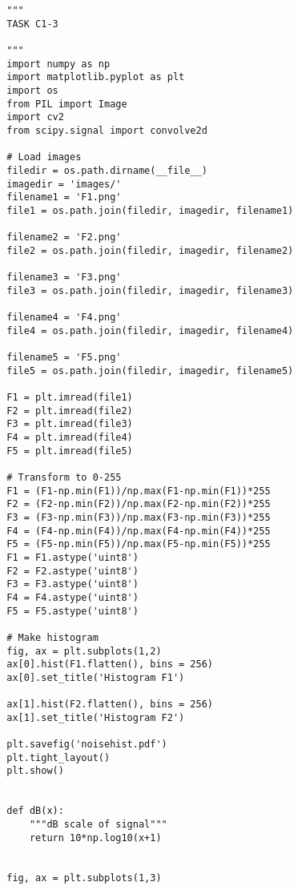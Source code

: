 {\begin{figure}[hbt!]
    \begin{lstlisting}
        """
        TASK C1-3
        
        """
        import numpy as np 
        import matplotlib.pyplot as plt
        import os
        from PIL import Image
        import cv2
        from scipy.signal import convolve2d
        
        # Load images
        filedir = os.path.dirname(__file__)
        imagedir = 'images/'
        filename1 = 'F1.png'
        file1 = os.path.join(filedir, imagedir, filename1)
        
        filename2 = 'F2.png'
        file2 = os.path.join(filedir, imagedir, filename2)
        
        filename3 = 'F3.png'
        file3 = os.path.join(filedir, imagedir, filename3)
        
        filename4 = 'F4.png'
        file4 = os.path.join(filedir, imagedir, filename4)
        
        filename5 = 'F5.png'
        file5 = os.path.join(filedir, imagedir, filename5)
        
        F1 = plt.imread(file1)
        F2 = plt.imread(file2)
        F3 = plt.imread(file3)
        F4 = plt.imread(file4)
        F5 = plt.imread(file5)
        
        # Transform to 0-255
        F1 = (F1-np.min(F1))/np.max(F1-np.min(F1))*255
        F2 = (F2-np.min(F2))/np.max(F2-np.min(F2))*255
        F3 = (F3-np.min(F3))/np.max(F3-np.min(F3))*255
        F4 = (F4-np.min(F4))/np.max(F4-np.min(F4))*255
        F5 = (F5-np.min(F5))/np.max(F5-np.min(F5))*255
        F1 = F1.astype('uint8')
        F2 = F2.astype('uint8')
        F3 = F3.astype('uint8')
        F4 = F4.astype('uint8')
        F5 = F5.astype('uint8')
        
        # Make histogram
        fig, ax = plt.subplots(1,2)
        ax[0].hist(F1.flatten(), bins = 256)
        ax[0].set_title('Histogram F1')
        
        ax[1].hist(F2.flatten(), bins = 256)
        ax[1].set_title('Histogram F2')
        
        plt.savefig('noisehist.pdf')
        plt.tight_layout()
        plt.show()
        
        
        def dB(x):
            """dB scale of signal"""
            return 10*np.log10(x+1)
        
        
        fig, ax = plt.subplots(1,3)
        

\end{lstlisting}
\end{figure}}
